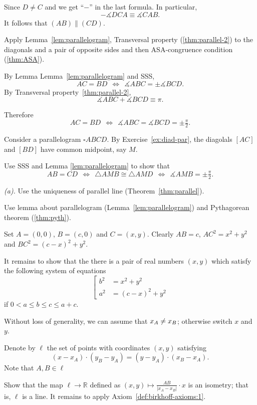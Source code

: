 Since $D\ne C$ and we get ``$-$'' in the last formula.
In particular,
$$-\measuredangle DCA\equiv \measuredangle CAB.$$
It follows that $(AB)\parallel (CD)$.

Apply Lemma~\ref{lem:parallelogram},
Transversal property (\ref{thm:parallel-2}) to the diagonals and a pair of opposite sides and then ASA-congruence condition (\ref{thm:ASA}).

By Lemma Lemma~\ref{lem:parallelogram} and SSS, 
\[AC=BD\ \ \Leftrightarrow\ \ \measuredangle ABC=\pm \measuredangle BCD.\]
By Transversal property~\ref{thm:parallel-2}, 
\[\measuredangle ABC+\measuredangle BCD\equiv \pi.\]

Therefore 
\[AC=BD\ \ \Leftrightarrow
\ \ 
\measuredangle ABC
=\measuredangle BCD
=\pm\tfrac\pi2.\]

Consider a parallelogram $\square ABCD$.
By Exercise~\ref{ex:diad-par},
the diagolals $[AC]$ and $[BD]$ have common midpoint, say $M$.

Use SSS and Lemma \ref{lem:parallelogram} to show that
\[AB=CD\ \ \Leftrightarrow\ \ \triangle AMB\cong\triangle AMD\ \ \Leftrightarrow\ \ \measuredangle AMB=\pm\tfrac\pi2.\]

 \textit{(a).} Use the uniqueness of parallel line (Theorem~\ref{thm:parallel}).

 Use lemma about parallelogram (Lemma~\ref{lem:parallelogram}) and Pythagorean theorem (\ref{thm:pyth}).

Set $A=(0,0)$, $B=(c,0)$ and $C=(x,y)$.
Clearly $AB=c$,
$AC^2=x^2+y^2$ and $BC^2=(c-x)^2+y^2$.

It remains to show that the there is a pair of real numbers $(x,y)$ 
which satisfy the following system of equations 
$$
\left[
\begin{aligned}
b^2&=x^2+y^2
\\
a^2&=(c-x)^2+y^2
\end{aligned}
\right.
$$
if $0<a\le b\le c\le a+c$.
\qeds

Without loss of generality, we can assume that $x_A\z\ne x_B$;
otherwise switch $x$ and $y$.

Denote by $\ell$ the set of points with coordinates $(x,y)$ satisfying
\[(x-x_A)\cdot (y_B-y_A)=(y-y_A)\cdot (x_B-x_A).\]
Note that $A, B\in \ell$

Show that the map $\ell\to \mathbb{R}$ defined as
$(x,y)\mapsto \tfrac{AB}{|x_A-x_B|}\cdot x$ is an isometry;
that is, $\ell$ is a line.
It remains to apply Axiom~\ref{def:birkhoff-axioms:1}.


